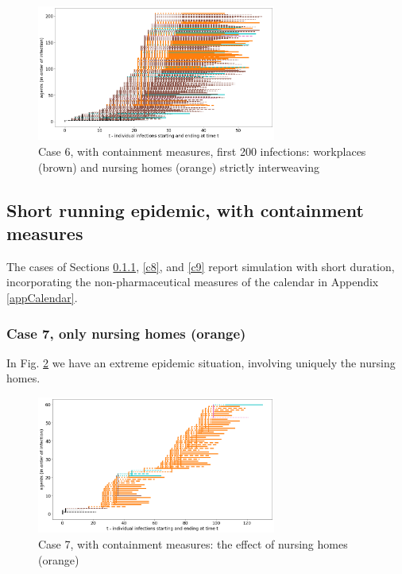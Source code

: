 \documentclass[graybox]{svmult}
\begin{document}
\begin{figure}[t]
\begin{center}
\includegraphics[width=0.7\textwidth]{with8b.png}%
\caption{Case 6, with containment measures, first 200 infections: workplaces (brown) and nursing homes (orange) strictly interweaving}
\label{8b}
\end{center}
\end{figure}



\subsection{Short running epidemic, with containment measures}

The cases of Sections \ref{c7}, \ref{c8}, and \ref {c9} report simulation with short duration, incorporating the non-pharmaceutical measures of the calendar in Appendix \ref{appCalendar}.


\subsubsection{Case 7, only nursing homes (orange)}
\label{c7}

In Fig. \ref{0} we have an extreme epidemic situation, involving uniquely the nursing homes.

\begin{figure}[t]
\begin{center}
\includegraphics[width=0.7\textwidth]{withShort0.png}%
\caption{Case 7, with containment measures: the effect of nursing homes (orange)}
\label{0}
\end{center}
\end{figure}
\end{document}
